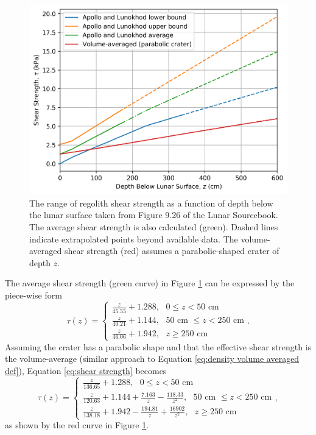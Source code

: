 \documentclass{article}
\begin{document}
\begin{figure}[!htb]
	\centering
	\includegraphics[width=\linewidth]{shear_strength_vs_depth.png}
	\caption{The range of regolith shear strength as a function of depth below the lunar surface taken from Figure 9.26 of the Lunar Sourcebook. The average shear strength is also calculated (green). Dashed lines indicate extrapolated points beyond available data. The volume-averaged shear strength (red) assumes a parabolic-shaped crater of depth $z$.}
	\label{fig:shear_strength_vs_depth}
\end{figure}

The average shear strength (green curve) in Figure \ref{fig:shear_strength_vs_depth} can be expressed by the piece-wise form
\begin{equation}\label{eq:shear strength}
\tau(z) =
\begin{cases}
\frac{z}{45.55} + 1.288,\text{   $0 \le z < 50$ cm}\\
\frac{z}{40.21} + 1.144,\text{   $50$ cm $\le z < 250$ cm}\\
\frac{z}{46.06} + 1.942,\text{   $z \ge 250$ cm}
\end{cases}.
\end{equation}
Assuming the crater has a parabolic shape and that the effective shear strength is the volume-average (similar approach to Equation \eqref{eq:density volume averaged def}), Equation \eqref{eq:shear strength} becomes
\begin{equation}\label{eq:shear strength_avg_para}
\tau(z) =
\begin{cases}
\frac{z}{136.65} + 1.288,\text{   $0 \le z < 50$ cm}\\
\frac{z}{120.63} + 1.144 + \frac{7.163}{z} - \frac{118.33}{z^2},\text{   $50$ cm $\le z < 250$ cm}\\
\frac{z}{138.18} + 1.942 - \frac{194.81}{z} + \frac{16902}{z^2},\text{   $z \ge 250$ cm}
\end{cases},
\end{equation}
as shown by the red curve in Figure \ref{fig:shear_strength_vs_depth}.
\end{document}

